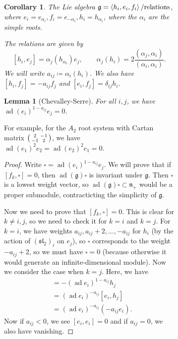\documentclass[leqno, openany]{memoir}
\newtheorem{cor}[thm]{Corollary}
\newtheorem{lem}[thm]{Lemma}
\theoremstyle{definition}
\theoremstyle{remark}
\theoremstyle{plain}
\theoremstyle{definition}
\theoremstyle{remark}
\newcommand{\mf}[1]{\mathfrak{#1}}
\DeclareMathOperator{\ad}{ad}
\begin{document}
\begin{figure}[H]
\begin{figure}[H]
\begin{cor} The Lie algebra $\mf{g} = \ev{h_i, e_i, f_i} / \text{relations}$,
    where $e_i = e_{\alpha_i}, f_i = e_{-\alpha_i}, h_i = h_{\alpha_i}$, where
    the $\alpha_i$ are the simple roots.

    The relations are given by \[ [h_i, e_j] = \alpha_j(h_{\alpha_i}) e_j,
    \qquad \alpha_j(h_i) = 2 \frac{(\alpha_j, \alpha_i)}{(\alpha_i, \alpha_i)}.
\] We will write $a_{ij} \coloneqq \alpha_i(h_i)$. We also have $[h_i, f_j] = -
a_{ij} f_j$ and $[e_i, f_j] = \delta_{ij} h_i$.  \end{cor}

\begin{lem}[Chevalley-Serre] For all $i,j$, we have ${\ad(e_i)}^{1-a_{ij}} e_j
= 0$.  \end{lem}

For example, for the $A_2$ root system with Cartan matrix $\begin{psmallmatrix}
2 & -1 \\ -1 & 2 \end{psmallmatrix}$, we have ${\ad(e_1)}^2 e_2 = {\ad(e_2)}^2
e_1 = 0$.

\begin{proof} Write $\square = {\ad(e_i)}^{1-a_{ij}} e_j$. We will prove that
    if $[f_k, \square] = 0$, then $\ad(\mf{g}) \square$ is invariant under
    $\mf{g}$. Then $\square$ is a lowest weight vector, so $\ad(\mf{g}) \square
    \subset \mf{n}_+$ would be a proper submodule, contracticting the
    simplicity of $\mf{g}$.

    Now we need to prove that $[f_k, \square] = 0$. This is clear for $k \neq
    i,j$, so we need to check it for $k=i$ and $k=j$. For $k=i$, we have
    weights $a_{ij}, a_{ij}+2, \ldots, -a_{ij}$ for $h_i$ (by the action of
    ${(\mf{sl}_2)}_i$ on $e_j$), so $\square$ corresponds to the weight
    $-a_{ij} + 2$, so we must have $\square = 0$ (because otherwise it would
    generate an infinite-dimensional module). Now we consider the case when
    $k=j$. Here, we have \begin{align*} [f_j, {(\ad e_i)}^{1-a_{ij}} e_j] &= -
    {(\ad e_i)}^{1-a_{ij}} h_j \\ &= {(\ad e_i)}^{-a_{ij}} [e_i, h_j] \\ &=
{(\ad e_i)}^{-a_{ij}} (-a_{ij} e_i).  \end{align*} Now if $a_{ij} < 0$, we see
$[e_i, e_i] = 0$ and if $a_{ij} = 0$, we also have vanishing.  \end{proof}


\end{figure}
\end{figure}
\end{document}
